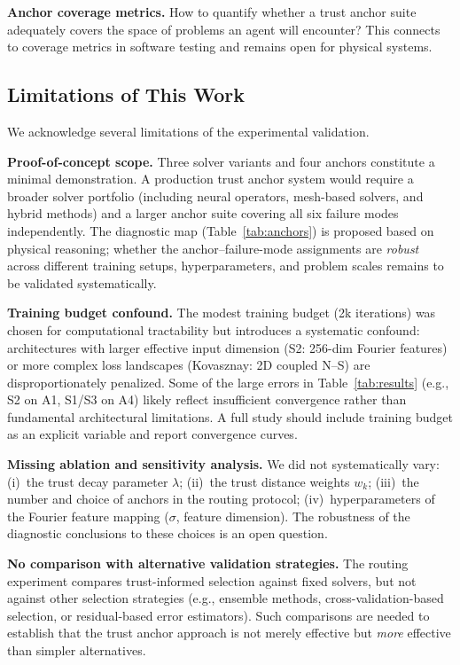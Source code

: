 \documentclass[conference]{IEEEtran}
\begin{document}
\textbf{Anchor coverage metrics.} How to quantify whether a trust anchor suite adequately covers the space of problems an agent will encounter? This connects to coverage metrics in software testing and remains open for physical systems.

\subsection{Limitations of This Work}

We acknowledge several limitations of the experimental validation.

\textbf{Proof-of-concept scope.} Three solver variants and four anchors constitute a minimal demonstration. A production trust anchor system would require a broader solver portfolio (including neural operators, mesh-based solvers, and hybrid methods) and a larger anchor suite covering all six failure modes independently. The diagnostic map (Table~\ref{tab:anchors}) is proposed based on physical reasoning; whether the anchor--failure-mode assignments are \emph{robust} across different training setups, hyperparameters, and problem scales remains to be validated systematically.

\textbf{Training budget confound.} The modest training budget (2k iterations) was chosen for computational tractability but introduces a systematic confound: architectures with larger effective input dimension (S2: 256-dim Fourier features) or more complex loss landscapes (Kovasznay: 2D coupled N--S) are disproportionately penalized. Some of the large errors in Table~\ref{tab:results} (e.g., S2 on A1, S1/S3 on A4) likely reflect insufficient convergence rather than fundamental architectural limitations. A full study should include training budget as an explicit variable and report convergence curves.

\textbf{Missing ablation and sensitivity analysis.} We did not systematically vary: (i)~the trust decay parameter $\lambda$; (ii)~the trust distance weights $w_k$; (iii)~the number and choice of anchors in the routing protocol; (iv)~hyperparameters of the Fourier feature mapping ($\sigma$, feature dimension). The robustness of the diagnostic conclusions to these choices is an open question.

\textbf{No comparison with alternative validation strategies.} The routing experiment compares trust-informed selection against fixed solvers, but not against other selection strategies (e.g., ensemble methods, cross-validation-based selection, or residual-based error estimators). Such comparisons are needed to establish that the trust anchor approach is not merely effective but \emph{more} effective than simpler alternatives.
\end{document}
